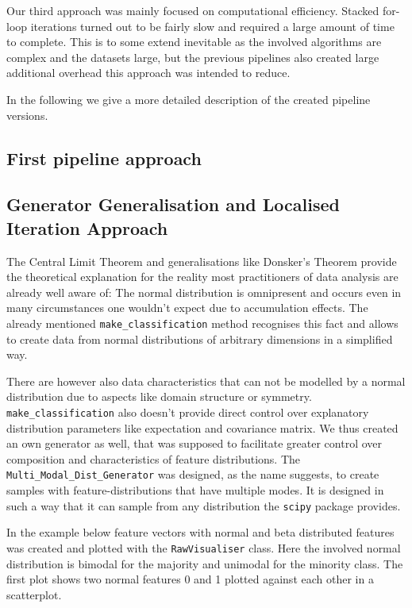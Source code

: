 Our third approach was mainly focused on computational efficiency. 
Stacked for-loop iterations turned out to be fairly slow and required a large amount of time to complete.
This is to some extend inevitable as the involved algorithms are complex and the datasets large, 
but the previous pipelines also created large additional overhead this approach was intended to reduce.

In the following we give a more detailed description of the created pipeline versions.

\subsection{First pipeline approach}



\subsection{Generator Generalisation and Localised Iteration Approach}

The Central Limit Theorem and generalisations like Donsker's Theorem provide the theoretical explanation for the reality most practitioners
of data analysis are already well aware of: The normal distribution is omnipresent and occurs even in many circumstances one wouldn't expect due to accumulation effects.
The already mentioned \texttt{make\_classification} method recognises this fact and allows to create data from normal distributions of arbitrary dimensions in a simplified way.

There are however also data characteristics that can not be modelled by a normal distribution due to aspects like domain structure or symmetry.
\texttt{make\_classification} also doesn't provide direct control over explanatory distribution parameters like expectation and covariance matrix.
We thus created an own generator as well, that was supposed to facilitate greater control over composition and characteristics of feature distributions.
The \texttt{Multi\_Modal\_Dist\_Generator} was designed, as the name suggests, to create samples with feature-distributions that have multiple modes.
It is designed in such a way that it can sample from any distribution the \texttt{scipy} package provides.

In the example below feature vectors with normal and beta distributed features was created and plotted with the \texttt{RawVisualiser} class.
Here the involved normal distribution is bimodal for the majority and unimodal for the minority class. 
The first plot shows two normal features 0 and 1 plotted against each other in a scatterplot. 

